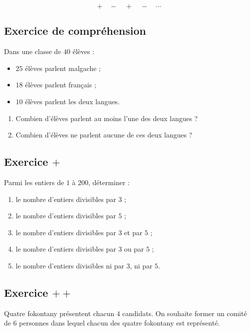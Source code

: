 \[
\boxed{
+\quad -\quad +\quad -\quad \cdots
}
\]

\subsection{Exercice de compréhension}

Dans une classe de \(40\) élèves :
\begin{itemize}
    \item \(25\) élèves parlent malgache ;
    \item \(18\) élèves parlent français ;
    \item \(10\) élèves parlent les deux langues.
\end{itemize}

\begin{enumerate}
    \item Combien d'élèves parlent au moins l'une des deux langues ?
    \item Combien d'élèves ne parlent aucune de ces deux langues ?
\end{enumerate}

\subsection{Exercice \(+\)}

Parmi les entiers de \(1\) à \(200\), déterminer :
\begin{enumerate}
    \item le nombre d'entiers divisibles par \(3\) ;
    \item le nombre d'entiers divisibles par \(5\) ;
    \item le nombre d'entiers divisibles par \(3\) et par \(5\) ;
    \item le nombre d'entiers divisibles par \(3\) ou par \(5\) ;
    \item le nombre d'entiers divisibles ni par \(3\), ni par \(5\).
\end{enumerate}

\subsection{Exercice \(++\)}

Quatre fokontany présentent chacun \(4\) candidats. On souhaite former un comité
de \(6\) personnes dans lequel chacun des quatre fokontany est représenté.

